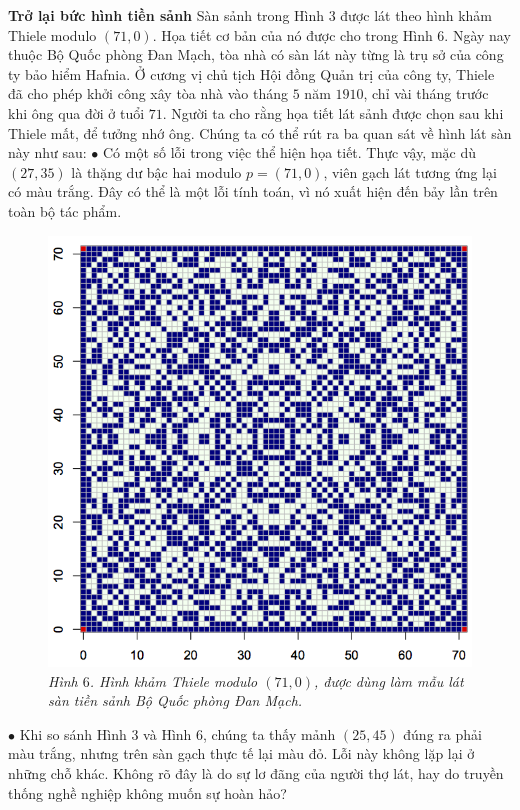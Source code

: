 \begin{multicols}{2}
	\vskip 0.2cm
	\textbf{\color{toanhocdoisong}Trở lại bức hình tiền sảnh}
	\vskip 0.1cm
	Sàn sảnh trong Hình $3$ được lát theo hình khảm Thiele modulo $(71, 0)$. Họa tiết cơ bản của nó được cho trong Hình $6$. Ngày nay thuộc Bộ Quốc phòng Đan Mạch, tòa nhà có sàn lát này từng là trụ sở của công ty bảo hiểm Hafnia. Ở cương vị chủ tịch Hội đồng Quản trị của công ty, Thiele đã cho phép khởi công xây tòa nhà vào tháng $5$ năm $1910$, chỉ vài tháng trước khi ông qua đời ở tuổi $71$. Người ta cho rằng họa tiết lát sảnh được chọn sau khi Thiele mất, để tưởng nhớ ông.
	\vskip 0.1cm
	Chúng ta có thể rút ra ba quan sát về hình lát sàn này như sau:
	\vskip 0.1cm
	$\bullet$ Có một số lỗi trong việc thể hiện họa tiết. Thực vậy, mặc dù $(27, 35)$ là thặng dư bậc hai modulo $p = (71, 0)$, viên gạch lát tương ứng lại có màu trắng. Đây có thể là một lỗi tính toán, vì nó xuất hiện đến bảy lần trên toàn bộ tác phẩm.
	\begin{figure}[H]
		\vspace*{-5pt}
		\centering
		\captionsetup{labelformat= empty, justification=centering}
		\includegraphics[width= 0.85\linewidth]{mosaique-9.png}
		\caption{\small\textit{\color{toanhocdoisong}Hình $6$. Hình khảm Thiele modulo $(71, 0)$, được dùng làm mẫu lát sàn tiền sảnh Bộ Quốc phòng Đan Mạch.}}
		\vspace*{-10pt}
	\end{figure}
	$\bullet$ Khi so sánh Hình $3$ và Hình $6$, chúng ta thấy mảnh $(25, 45)$ đúng ra phải màu trắng, nhưng trên sàn gạch thực tế lại màu đỏ. Lỗi này không lặp lại ở những chỗ khác. Không rõ đây là do sự lơ đãng của người thợ lát, hay do truyền thống nghề nghiệp không muốn sự hoàn hảo?

\end{multicols}

